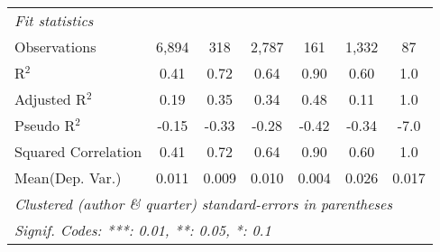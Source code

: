 \begin{tabular}{lcccccc}
   \midrule
   \emph{Fit statistics}\\
   Observations                                               & 6,894         & 318     & 2,787   & 161           & 1,332         & 87\\  
   R$^2$                                                      & 0.41          & 0.72    & 0.64    & 0.90          & 0.60          & 1.0\\  
   Adjusted R$^2$                                             & 0.19          & 0.35    & 0.34    & 0.48          & 0.11          & 1.0\\  
   Pseudo R$^2$                                               & -0.15         & -0.33   & -0.28   & -0.42         & -0.34         & -7.0\\  
   Squared Correlation                                        & 0.41          & 0.72    & 0.64    & 0.90          & 0.60          & 1.0\\  
Mean(Dep. Var.) & 0.011 & 0.009 & 0.010 & 0.004 & 0.026 & 0.017 \\
   \midrule \midrule
   \multicolumn{7}{l}{\emph{Clustered (author \& quarter) standard-errors in parentheses}}\\
   \multicolumn{7}{l}{\emph{Signif. Codes: ***: 0.01, **: 0.05, *: 0.1}}\\
\end{tabular}
\par\endgroup
